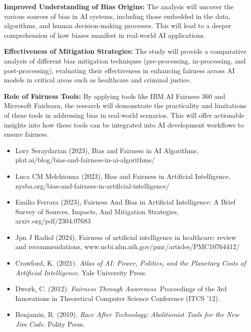 \documentclass[a4paper, 12pt]{article}
\begin{document}
 \textbf{Improved Understanding of Bias Origins:} The analysis will uncover the various sources of bias in AI systems, including those embedded in the data, algorithms, and human decision-making processes. This will lead to a deeper comprehension of how biases manifest in real-world AI applications.

 \textbf{Effectiveness of Mitigation Strategies:} The study will provide a comparative analysis of different bias mitigation techniques (pre-processing, in-processing, and post-processing), evaluating their effectiveness in enhancing fairness across AI models in critical areas such as healthcare and criminal justice.
 
\textbf{Role of Fairness Tools:} By applying tools like IBM AI Fairness 360 and Microsoft Fairlearn, the research will demonstrate the practicality and limitations of these tools in addressing bias in real-world scenarios. This will offer actionable insights into how these tools can be integrated into AI development workflows to ensure fairness. 



\begin{itemize}
    \item Lory Seraydarian (2023), Bias and Fairness in AI Algorithms, plat.ai/blog/bias-and-fairness-in-ai-algorithms/ 
    \item Luca CM Melchionna (2023), Bias and Fairness in Artificial Intelligence, nysba.org/bias-and-fairness-in-artificial-intelligence/ 
    \item Emilio Ferrara (2023), Fairness And Bias in Artificial Intelligence: A Brief Survey of Sources, Impacts, And Mitigation Strategies, arxiv.org/pdf/2304.07683
    \item Jpn J Radiol (2024), Fairness of artificial intelligence in healthcare: review and recommendations, www.ncbi.nlm.nih.gov/pmc/articles/PMC10764412/
    \item Crawford, K. (2021). \textit{Atlas of AI: Power, Politics, and the Planetary Costs of Artificial Intelligence}. Yale University Press. 
    \item Dwork, C. (2012). \textit{Fairness Through Awareness}. Proceedings of the 3rd Innovations in Theoretical Computer Science Conference (ITCS '12). 
    \item Benjamin, R. (2019). \textit{Race After Technology: Abolitionist Tools for the New Jim Code}. Polity Press. 
\end{itemize}
\end{document}
